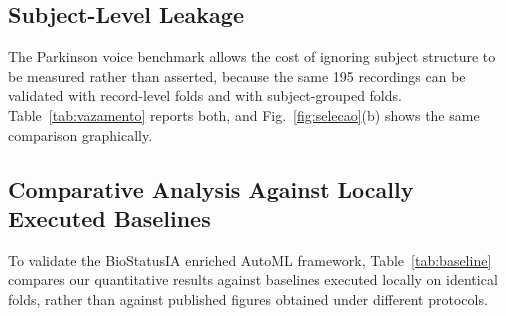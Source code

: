 \documentclass[conference]{IEEEtran}
\begin{document}
\subsection{Subject-Level Leakage}
\label{sec:vazamento}
The Parkinson voice benchmark allows the cost of ignoring subject structure to be measured rather than asserted, because the same 195 recordings can be validated with record-level folds and with subject-grouped folds. Table~\ref{tab:vazamento} reports both, and Fig.~\ref{fig:selecao}(b) shows the same comparison graphically.

\begin{table}[htbp]
\caption{Effect of Subject Grouping on the UCI Parkinson Voice Benchmark (195 Recordings, 32 Subjects). Same Data, Same Model Space, Same Seed; Only the Fold Assignment Differs.}
\label{tab:vazamento}
\centering
{}
\end{table}


\subsection{Comparative Analysis Against Locally Executed Baselines}
To validate the BioStatusIA enriched AutoML framework, Table~\ref{tab:baseline} compares our quantitative results against baselines executed locally on identical folds, rather than against published figures obtained under different protocols.

\begin{table}[htbp]
\caption{Quantitative Diagnostic Benchmark Comparison Between BioStatusIA AutoML and Locally Executed Baselines on Identical Folds: a Conventional Standardization + Logistic Regression Pipeline, and the FLAML AutoML System Under a 20\,s Per-Fold Budget. $p$-Values Are From the Paired Wilcoxon Signed-Rank Test Over the Five Per-Fold Values.}
\label{tab:baseline}
\centering
{}
\end{table}
\end{document}

